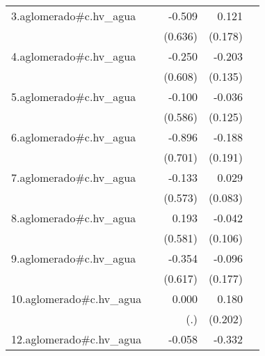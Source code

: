 {\begin{longtable}{l*{4}{D{.}{.}{-1}}}
\addlinespace
3.aglomerado#c.hv\_agua&                     &      -0.509         &       0.121         &                     \\
            &                     &     (0.636)         &     (0.178)         &                     \\
\addlinespace
4.aglomerado#c.hv\_agua&                     &      -0.250         &      -0.203         &                     \\
            &                     &     (0.608)         &     (0.135)         &                     \\
\addlinespace
5.aglomerado#c.hv\_agua&                     &      -0.100         &      -0.036         &                     \\
            &                     &     (0.586)         &     (0.125)         &                     \\
\addlinespace
6.aglomerado#c.hv\_agua&                     &      -0.896         &      -0.188         &                     \\
            &                     &     (0.701)         &     (0.191)         &                     \\
\addlinespace
7.aglomerado#c.hv\_agua&                     &      -0.133         &       0.029         &                     \\
            &                     &     (0.573)         &     (0.083)         &                     \\
\addlinespace
8.aglomerado#c.hv\_agua&                     &       0.193         &      -0.042         &                     \\
            &                     &     (0.581)         &     (0.106)         &                     \\
\addlinespace
9.aglomerado#c.hv\_agua&                     &      -0.354         &      -0.096         &                     \\
            &                     &     (0.617)         &     (0.177)         &                     \\
\addlinespace
10.aglomerado#c.hv\_agua&                     &       0.000         &       0.180         &                     \\
            &                     &         (.)         &     (0.202)         &                     \\
\addlinespace
12.aglomerado#c.hv\_agua&                     &      -0.058         &      -0.332         &                     \\

\end{longtable}}
